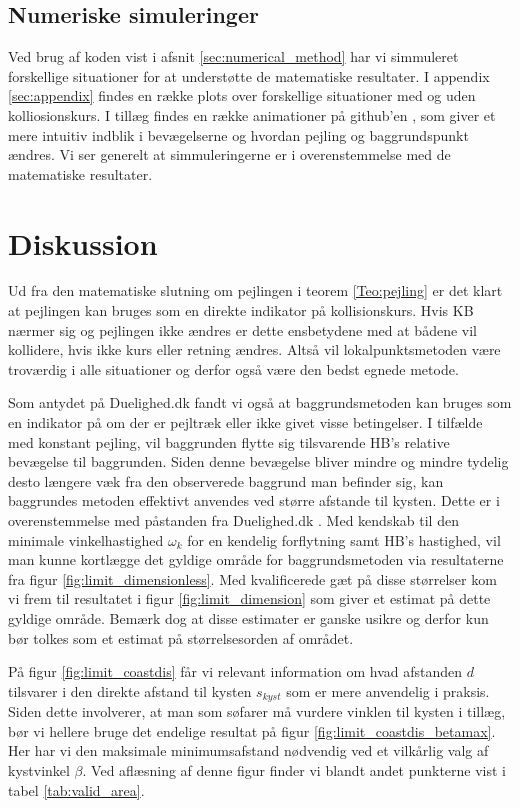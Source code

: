 \documentclass[%
 reprint,
nofootinbib,
aps,
]{revtex4-1}
\begin{document}
\subsection{Numeriske simuleringer}
Ved brug af koden vist i afsnit \ref{sec:numerical_method} har vi simmuleret forskellige situationer for at understøtte de matematiske resultater. I appendix \ref{sec:appendix} findes en række plots over forskellige situationer med og uden kolliosionskurs. I tillæg findes en række animationer på github'en \cite{github}, som giver et mere intuitiv indblik i bevægelserne og hvordan pejling og baggrundspunkt ændres. Vi ser generelt at simmuleringerne er i overenstemmelse med de matematiske resultater.


\section{Diskussion}
Ud fra den matematiske slutning om pejlingen i teorem \ref{Teo:pejling} er det klart at pejlingen kan bruges som en direkte indikator på kollisionskurs. Hvis KB nærmer sig og pejlingen ikke ændres er dette ensbetydene med at bådene vil kollidere, hvis ikke kurs eller retning ændres. Altså vil lokalpunktsmetoden være troværdig i alle situationer og derfor også være den bedst egnede metode. \par
Som antydet på Duelighed.dk \cite{duelighed} fandt vi også at baggrundsmetoden kan bruges som en indikator på om der er pejltræk eller ikke givet visse betingelser. I tilfælde med konstant pejling, vil baggrunden flytte sig tilsvarende HB's relative bevægelse til baggrunden. Siden denne bevægelse bliver mindre og mindre tydelig desto længere væk fra den observerede baggrund man befinder sig, kan baggrundes metoden effektivt anvendes ved større afstande til kysten. Dette er i overenstemmelse med påstanden fra Duelighed.dk \cite{duelighed}. Med kendskab til den minimale vinkelhastighed $\omega_k$ for en kendelig forflytning samt HB's hastighed, vil man kunne kortlægge det gyldige område for baggrundsmetoden via resultaterne fra figur \ref{fig:limit_dimensionless}. Med kvalificerede gæt på disse størrelser kom vi frem til resultatet i figur \ref{fig:limit_dimension} som giver et estimat på dette gyldige område. Bemærk dog at disse estimater er ganske usikre og derfor kun bør tolkes som et estimat på størrelsesorden af området. \par
På figur \ref{fig:limit_coastdis} får vi relevant information om hvad afstanden $d$ tilsvarer i den direkte afstand til kysten $s_{kyst}$ som er mere anvendelig i praksis. Siden dette involverer, at man som søfarer må vurdere vinklen til kysten i tillæg, bør vi hellere bruge det endelige resultat på figur \ref{fig:limit_coastdis_betamax}. Her har vi den maksimale minimumsafstand nødvendig ved et vilkårlig valg af kystvinkel $\beta$. Ved aflæsning af denne figur finder vi blandt andet punkterne vist i tabel \ref{tab:valid_area}.
\end{document}
